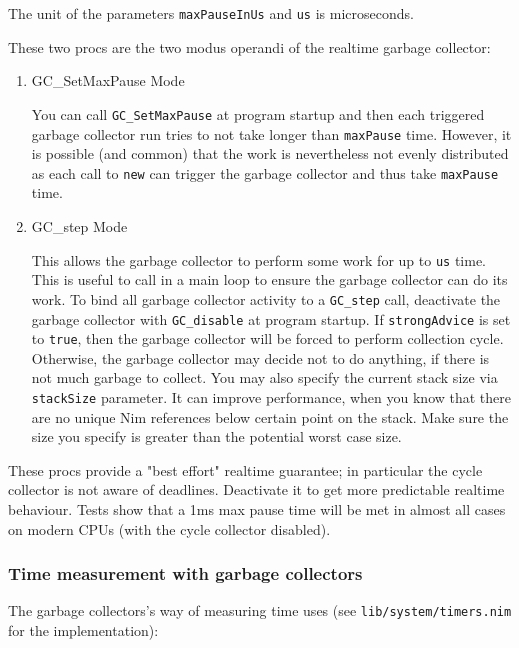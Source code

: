 The unit of the parameters \texttt{maxPauseInUs} and \texttt{us} is
microseconds.

These two procs are the two modus operandi of the realtime garbage
collector:

\begin{enumerate}
\def\labelenumi{(\arabic{enumi})}
\item
  GC\_SetMaxPause Mode

  You can call \texttt{GC\_SetMaxPause} at program startup and then each
  triggered garbage collector run tries to not take longer than
  \texttt{maxPause} time. However, it is possible (and common) that the
  work is nevertheless not evenly distributed as each call to
  \texttt{new} can trigger the garbage collector and thus take
  \texttt{maxPause} time.
\item
  GC\_step Mode

  This allows the garbage collector to perform some work for up to
  \texttt{us} time. This is useful to call in a main loop to ensure the
  garbage collector can do its work. To bind all garbage collector
  activity to a \texttt{GC\_step} call, deactivate the garbage collector
  with \texttt{GC\_disable} at program startup. If \texttt{strongAdvice}
  is set to \texttt{true}, then the garbage collector will be forced to
  perform collection cycle. Otherwise, the garbage collector may decide
  not to do anything, if there is not much garbage to collect. You may
  also specify the current stack size via \texttt{stackSize} parameter.
  It can improve performance, when you know that there are no unique Nim
  references below certain point on the stack. Make sure the size you
  specify is greater than the potential worst case size.
\end{enumerate}

These procs provide a "best effort" realtime guarantee; in particular
the cycle collector is not aware of deadlines. Deactivate it to get more
predictable realtime behaviour. Tests show that a 1ms max pause time
will be met in almost all cases on modern CPUs (with the cycle collector
disabled).

\hypertarget{time-measurement-with-garbage-collectors}{%
\subsubsection{Time measurement with garbage
collectors}\label{time-measurement-with-garbage-collectors}}

The garbage collectors's way of measuring time uses (see
\texttt{lib/system/timers.nim} for the implementation):


